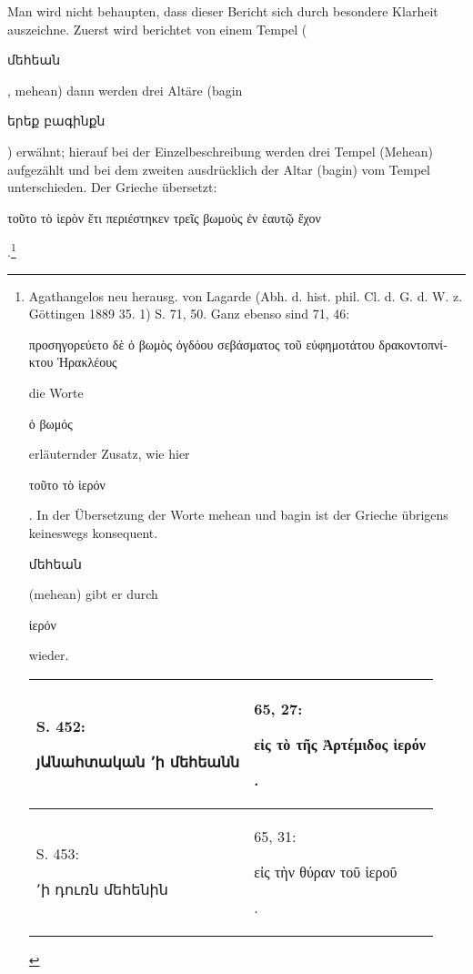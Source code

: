 \documentclass{article}
\begin{document}
Man wird nicht behaupten, dass dieser Bericht sich durch besondere Klarheit auszeichne. Zuerst wird berichtet von einem Tempel (\begin{armenian}մեհեան\end{armenian}, mehean) dann werden drei Altäre (bagin \begin{armenian}երեք բագինքն\end{armenian}) erwähnt; hierauf bei der Einzelbeschreibung werden drei Tempel (Mehean) aufgezählt und bei dem zweiten ausdrücklich der Altar (bagin) vom Tempel unterschieden. Der Grieche übersetzt: \begin{greek}τοῦτο τὸ ἱερὸν ἔτι περιέστηκεν τρεῖς βωμοὺς ἐν ἑαυτῷ ἔχον\end{greek}.\footnote{Agathangelos neu herausg. von Lagarde (Abh. d. hist. phil. Cl. d. G. d. W. z. Göttingen 1889 35. 1) S. 71, 50. Ganz ebenso sind 71, 46: \begin{greek}προσηγορεύετο δὲ ὁ βωμὸς ὀγδόου σεβάσματος τοῦ εὐφημοτάτου δρακοντοπνίκτου Ἡρακλέους\end{greek} die Worte \begin{greek}ὁ βωμός\end{greek} erläuternder Zusatz, wie hier \begin{greek}τοῦτο τὸ ἱερόν\end{greek}. In der Übersetzung der Worte mehean und bagin ist der Grieche übrigens keineswegs konsequent. \begin{armenian}մեհեան\end{armenian} (mehean) gibt er durch \begin{greek}ἱερόν\end{greek} wieder.\hspace*{5mm}\begin{table}[H]
    \centering
    \tiny
    \begin{tabular}{p{45mm}|p{45mm}}
    \hline
        S. 452: \begin{armenian}յԱնահտական  ՚ի մեհեանն\end{armenian} & 65, 27: \begin{greek}εἰς τὸ τῆς Ἀρτέμιδος ἱερόν\end{greek}.   \\ \hline
        S. 453: \begin{armenian}՚ի դուռն մեհենին\end{armenian} & 65, 31: \begin{greek}εἰς τὴν θύραν τοῦ ἱεροῦ\end{greek}.   \\ \hline

\end{tabular}
\end{table}}
\end{document}
